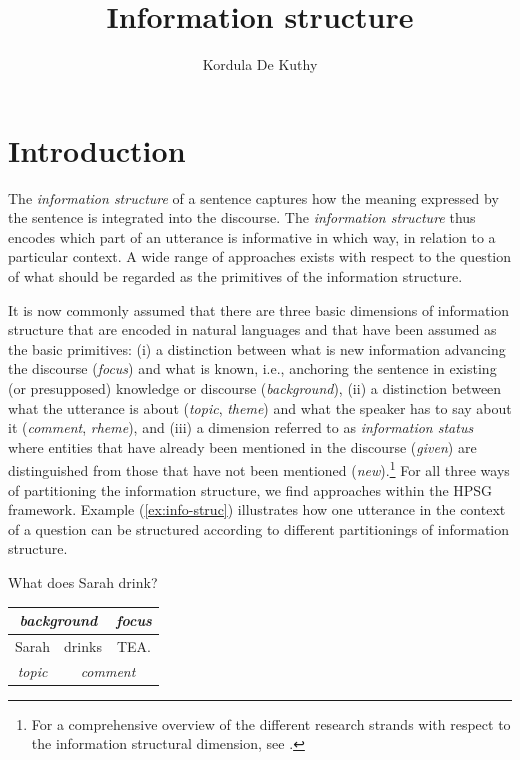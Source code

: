 \documentclass[output=paper
                ,modfonts
                ,nonflat
	        ,collection
	        ,collectionchapter
	        ,collectiontoclongg
 	        ,biblatex
                ,babelshorthands
                ,newtxmath
                ,draftmode
                ,colorlinks, citecolor=brown
]{./langsci/langscibook}
\author{Kordula {De Kuthy}\affiliation{Universität Tübingen}}
\title{Information structure}
\begin{document}
\maketitle
\label{chap-information-structure}



\section{Introduction} 


The \textit{information structure} of a sentence captures how the meaning
expressed by the sentence is integrated into the discourse.
The \textit{information structure} thus encodes which part of an
  utterance is informative in which way, in relation to a particular context.
A wide range of approaches exists with respect to the question of what
should be regarded as the primitives of the information structure.

It is now commonly assumed that there are three basic dimensions of
information structure that are encoded in natural languages and that
have been assumed as the basic primitives: (i) a distinction between
what is new information advancing the discourse (\emph{focus}) and
what is known, i.e., anchoring the sentence in existing (or
presupposed) knowledge or discourse (\emph{background}), (ii) a
distinction between what the utterance is about (\emph{topic},
\emph{theme}) and what the speaker has to say about it
(\emph{comment}, \emph{rheme}), and (iii) a dimension referred to as
\textit{information status} where entities that have already been
mentioned in the discourse (\textit{given}) are distinguished from
those that have not been mentioned (\emph{new}).\footnote{For a comprehensive overview of the different research strands with respect to the information structural dimension, see \citet{KruijffSteedman2003}.} For all three ways of
partitioning the information structure, we find approaches within the
HPSG framework.  Example (\ref{ex:info-struc}) illustrates how one
utterance in the context of a question can be structured according to
different partitionings of information structure.
\begin{exe}
\ex\label{ex:info-struc}
\begin{xlist}
  What does Sarah drink?
  \begin{tabular}[c]{|c|c|c|}
\multicolumn{2}{c|}{\small\textsl{background}} & \multicolumn{1}{c}{\small\textsl{focus}}\\\hline 
Sarah & drinks & TEA.\\\hline
\multicolumn{1}{c|}{\small\textsl{topic}} & \multicolumn{2}{c}{\small\textsl{comment}}\\
  \end{tabular}
\end{xlist}

\end{exe}
\end{document}
